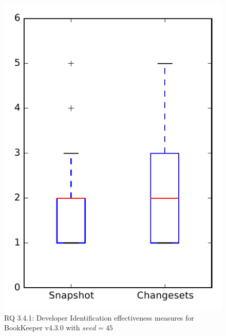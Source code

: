 
\begin{figure}
\centering
\includegraphics[height=0.4\textheight]{figures/dit_seed/rq1_bookkeeper_45}
\caption{RQ 3.4.1: Developer Identification effectiveness measures for BookKeeper v4.3.0 with $seed=45$}
\label{fig:dit_seed:rq1:bookkeeper}
\end{figure}
